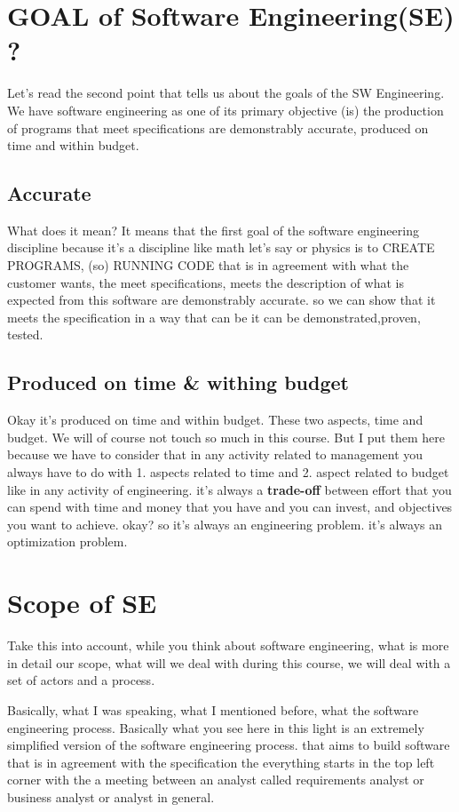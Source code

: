 \documentclass[conference, compsoc, twoside]{IEEEtran}
\begin{document}
\section{GOAL of Software Engineering(SE) ?} %

Let's read the second point that tells us about the goals of the SW Engineering. 
We have software engineering as one of its primary objective (is) the production of programs that meet specifications are demonstrably accurate, produced on time and within budget.

\subsection{Accurate}
What does it mean? It means that the first goal of the software engineering discipline because it's a discipline like math let's say or physics is to CREATE PROGRAMS, (so) RUNNING CODE that is in agreement with what the customer wants, the meet specifications, meets the description of what is expected from this software are demonstrably accurate. 
so we can show that it meets the specification in a way that can be it can be demonstrated,proven, tested.	
\subsection{Produced on time \& withing budget}
Okay it's produced on time and within budget.
These two aspects, time and budget. We will of course not touch so much in this course.
But I put them here because we have to consider that in any activity related to management you always have to do with 
1. aspects related to time and 
2. aspect related to budget 
like in any activity of engineering.
it's always a \textbf{trade-off} between effort that you can spend with time and money that you have and you can invest, and objectives you want to achieve. okay? 
so it's always an engineering problem. it's always an optimization problem.	
\section{Scope of SE} %
Take this into account, while you think about software engineering,
what is more in detail our scope, 
what will we deal with during this course,
we will deal with a set of actors and a process. 

Basically, what I was speaking, what I mentioned before, what the software engineering process. 
Basically what you see here in this light is an extremely simplified version of the software engineering process. 
that aims to build software that is in agreement with 
the specification the everything starts in the top left corner 
with the a meeting between an analyst called requirements analyst or business analyst or analyst in general. 
\end{document}
